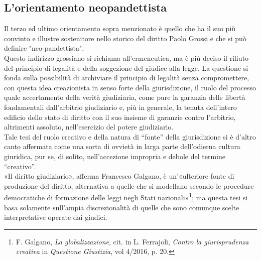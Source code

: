 \subsection{L'orientamento neopandettista}
Il terzo ed ultimo orientamento sopra menzionato è quello che ha il suo più convinto e illustre sostenitore nello storico del diritto Paolo Grossi e che si può definire "neo-pandettista".%
\\Questo indirizzo grossiano si richiama all’ermeneutica, ma è più deciso il rifiuto del principio di legalità e della soggezione del giudice alla legge.
La questione si fonda sulla possibilità di archiviare il principio di legalità senza compromettere, con questa idea creazionista in senso forte della giurisdizione, il ruolo del processo quale accertamento della verità giudiziaria, come pure la garanzia delle libertà fondamentali dall’arbitrio giudiziario e, più in generale, la tenuta dell’intero edificio dello stato di diritto con il suo insieme di garanzie contro l’arbitrio, altrimenti assoluto, nell’esercizio del potere giudiziario.
\\Tale tesi del ruolo creativo e della natura di “fonte” della giurisdizione si è d’altro canto affermata come una sorta di ovvietà in larga parte dell’odierna cultura giuridica, pur se, di solito, nell’accezione impropria e debole del termine “creativo”. 
\\«Il diritto giudiziario», afferma Francesco Galgano, è un’«ulteriore fonte di produzione del diritto, alternativa a quelle che si modellano secondo le procedure democratiche di formazione delle leggi negli Stati nazionali»\footnote{F. Galgano, \textit{La globalizzazione}, cit. in L. Ferrajoli, \textit{Contro la giurisprudenza creativa} in \textit{Questione Giustizia}, vol 4/2016, p. 20.}; ma questa tesi si basa solamente sull'ampia discrezionalità di quelle che sono comunque scelte interpretative operate dai giudici.
